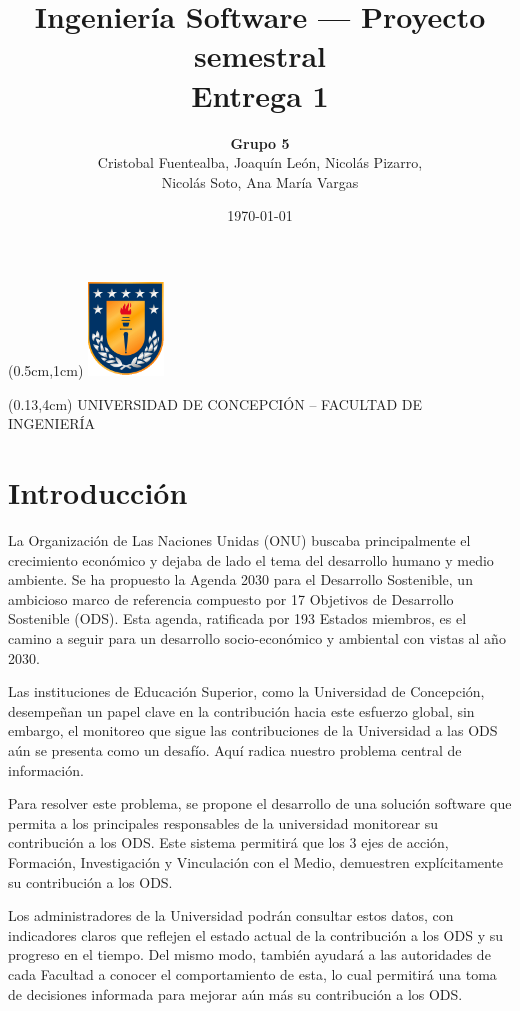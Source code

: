 \documentclass[12pt]{article}
\title{Ingeniería Software --- Proyecto semestral \\ Entrega 1 }
\author{\textbf{Grupo 5} \\ Cristobal Fuentealba, Joaquín León, Nicolás Pizarro,\\ Nicolás Soto, Ana María Vargas}
\date{\today}
\begin{document}
\begin{textblock*}{5cm}(0.5cm,1cm)
  \includegraphics[width=2cm]{escudo_udec.png}
\end{textblock*}

\begin{textblock*}{0.8\paperwidth}(0.13\paperwidth,4cm)
  \large{UNIVERSIDAD DE CONCEPCIÓN -- FACULTAD DE INGENIERÍA}
\end{textblock*}

\maketitle

\section{Introducción}

La Organización de Las Naciones Unidas (ONU) buscaba principalmente el crecimiento económico y dejaba de lado el tema del desarrollo humano y medio ambiente. Se ha propuesto la Agenda 2030 para el Desarrollo Sostenible, un ambicioso marco de referencia compuesto por 17 Objetivos de Desarrollo Sostenible (ODS). Esta agenda, ratificada por 193 Estados miembros, es el camino a seguir para un desarrollo socio-económico y ambiental con vistas al año 2030.

Las instituciones de Educación Superior, como la Universidad de Concepción, desempeñan un papel clave en la contribución hacia este esfuerzo global, sin embargo, el monitoreo que sigue las contribuciones de la Universidad a las ODS aún se presenta como un desafío. Aquí radica nuestro problema central de información.

Para resolver este problema, se propone el desarrollo de una solución software que permita a los principales responsables de la universidad monitorear su contribución a los ODS. Este sistema permitirá que los 3  ejes de acción, Formación, Investigación y Vinculación con el Medio, demuestren explícitamente su contribución a los ODS.

Los administradores de la Universidad podrán consultar estos datos, con indicadores claros que reflejen el estado actual de la contribución a los ODS y su progreso en el tiempo. Del mismo modo, también ayudará a las autoridades de cada Facultad a conocer el comportamiento de esta, lo cual permitirá una toma de decisiones informada para mejorar aún más su contribución a los ODS.
\end{document}
